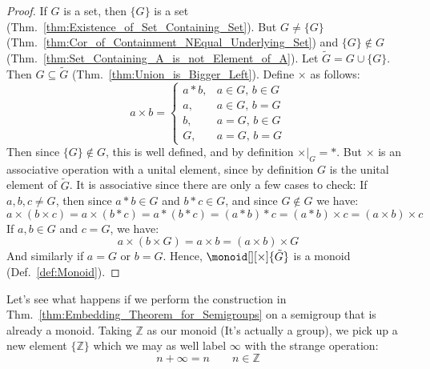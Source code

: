         \begin{proof}
            If $G$ is a set, then $\{G\}$ is a set
            (Thm.~\ref{thm:Existence_of_Set_Containing_Set}). But $G\ne\{G\}$
            (Thm.~\ref{thm:Cor_of_Containment_NEqual_Underlying_Set}) and
            $\{G\}\notin{G}$
            (Thm.~\ref{thm:Set_Containing_A_is_not_Element_of_A}). Let
            $\tilde{G}=G\cup\{G\}$. Then $G\subseteq\tilde{G}$
            (Thm.~\ref{thm:Union_is_Bigger_Left}). Define $\times$ as follows:
            \begin{equation}
                a\times{b}=
                \begin{cases}
                    a*b,&a\in{G},\,b\in{G}\\
                    a,&a\in{G},\,b=G\\
                    b,&a=G,\,b\in{G}\\
                    G,&a=G,\,b=G
                \end{cases}
            \end{equation}
            Then since $\{G\}\notin{G}$, this is well defined, and by definition
            $\times|_{G}=*$. But $\times$ is an associative operation with a
            unital element, since by definition $G$ is the unital element of
            $\tilde{G}$. It is associative since there are only a few cases to
            check: If $a,b,c\ne{G}$, then since $a*b\in{G}$ and $b*c\in{G}$, and
            since $G\notin{G}$ we have:
            \begin{equation}
                a\times(b\times{c})=a\times(b*c)=a*(b*c)=(a*b)*c=
                (a*b)\times{c}=(a\times{b})\times{c}
            \end{equation}
            If $a,b\in{G}$ and $c=G$, we have:
            \begin{equation}
                a\times(b\times{G})=a\times{b}=(a\times{b})\times{G}
            \end{equation}
            And similarly if $a=G$ or $b=G$. Hence,
            $\monoid[][\times]{\tilde{G}}$ is a monoid (Def.~\ref{def:Monoid}).
        \end{proof}
        Let's see what happens if we perform the construction in
        Thm.~\ref{thm:Embedding_Theorem_for_Semigroups} on a semigroup that is
        already a monoid. Taking $\mathbb{Z}$ as our monoid (It's actually a
        group), we pick up a new element $\{\mathbb{Z}\}$ which we may as well
        label $\infty$ with the strange operation:
        \begin{equation}
            n+\infty=n\quad\quad{n}\in\mathbb{Z}
        \end{equation}

